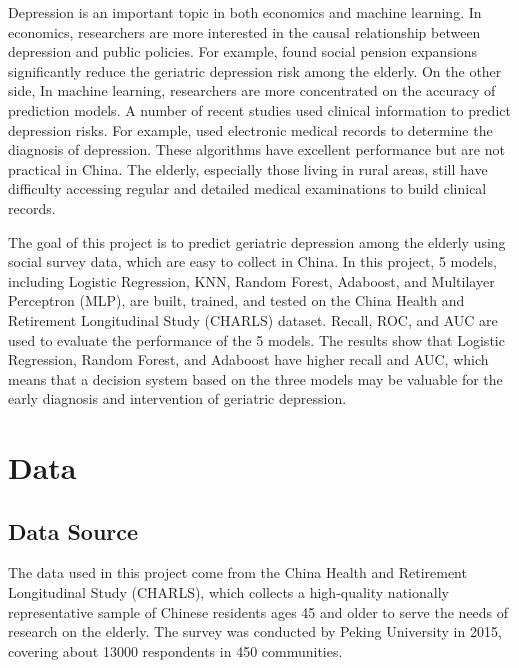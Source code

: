 \documentclass[12pt]{article}
\begin{document}
\par Depression is an important topic in both economics and machine learning. In economics, researchers are more interested in the causal relationship between depression and public policies. For example, \cite{chen2019does} found social pension expansions significantly reduce the geriatric depression risk among the elderly. On the other side, In machine learning, researchers are more concentrated on the accuracy of prediction models. A number of recent studies used clinical information to predict depression risks. For example, \cite{trinh2011using} used electronic medical records to determine the diagnosis of depression. These algorithms have excellent performance but are not practical in China. The elderly, especially those living in rural areas, still have difficulty accessing regular and detailed medical examinations to build clinical records.

\par The goal of this project is to predict geriatric depression among the elderly using social survey data, which are easy to collect in China. In this project, 5 models, including Logistic Regression, KNN, Random Forest, Adaboost, and Multilayer Perceptron (MLP), are built, trained, and tested on the China Health and Retirement Longitudinal Study (CHARLS) dataset. Recall, ROC, and AUC are used to evaluate the performance of the 5 models. The results show that Logistic Regression, Random Forest, and Adaboost have higher recall and AUC, which means that a decision system based on the three models may be valuable for the early diagnosis and intervention of geriatric depression.

\section{Data}
\subsection{Data Source}
\par The data used in this project come from the China Health and Retirement Longitudinal Study (CHARLS), which collects a high-quality nationally representative sample of Chinese residents ages 45 and older to serve the needs of research on the elderly. The survey was conducted by Peking University in 2015, covering about 13000 respondents in 450 communities.
\end{document}
